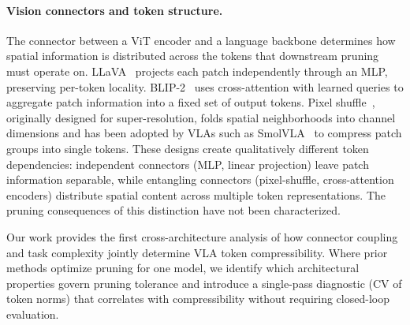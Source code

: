 \paragraph{Vision connectors and token structure.}
The connector between a ViT encoder and a language backbone determines how spatial information is distributed across the tokens that downstream pruning must operate on.
LLaVA~\cite{liu2023llava} projects each patch independently through an MLP, preserving per-token locality.
BLIP-2~\cite{li2023blip2} uses cross-attention with learned queries to aggregate patch information into a fixed set of output tokens.
Pixel shuffle~\cite{shi2016subpixel}, originally designed for super-resolution, folds spatial neighborhoods into channel dimensions and has been adopted by VLAs such as SmolVLA~\cite{shukor2025smolvla} to compress patch groups into single tokens.
These designs create qualitatively different token dependencies: independent connectors (MLP, linear projection) leave patch information separable, while entangling connectors (pixel-shuffle, cross-attention encoders) distribute spatial content across multiple token representations.
The pruning consequences of this distinction have not been characterized.

Our work provides the first cross-architecture analysis of how connector coupling and task complexity jointly determine VLA token compressibility.
Where prior methods optimize pruning for one model, we identify which architectural properties govern pruning tolerance and introduce a single-pass diagnostic (CV of token norms) that correlates with compressibility without requiring closed-loop evaluation.